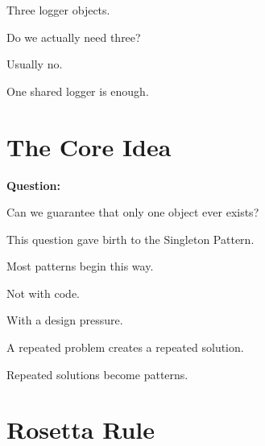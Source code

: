\documentclass[11pt,a4paper]{book}
\begin{document}

Three logger objects.


Do we actually need three?


Usually no.


One shared logger is enough.


\section{The Core Idea}

\textbf{Question:}


Can we guarantee that only one
object ever exists?


This question gave birth to
the Singleton Pattern.


\begin{idea}

Most patterns begin this way.


Not with code.


With a design pressure.


A repeated problem creates
a repeated solution.


Repeated solutions become patterns.

\end{idea}


\section{Rosetta Rule}
\end{document}
